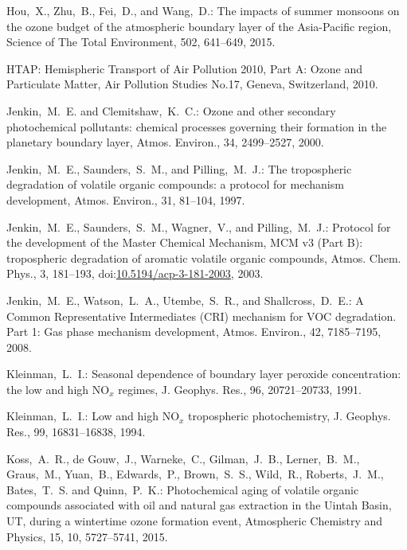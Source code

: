 \documentclass[acpd, online, hvmath]{copernicus}
\begin{document}
\begin{thebibliography}{34}
     Hou,~X., Zhu,~B., Fei,~D., and Wang,~D.: The impacts of summer monsoons on the ozone budget of the atmospheric boundary layer of the Asia-Pacific region, Science of The Total Environment, 502, 641--649, 2015.

  
 HTAP: Hemispheric Transport of Air
    Pollution 2010, Part A: Ozone and Particulate Matter, Air
    Pollution Studies No.17, Geneva, Switzerland, 2010.


 Jenkin,~M.~E. and
  Clemitshaw,~K.~C.: {Ozone and other secondary photochemical
    pollutants: chemical processes governing their formation in the
    planetary boundary layer}, Atmos. Environ., 34, 2499--2527,
  2000.


 Jenkin,~M.~E., Saunders,~S.~M., and
  Pilling,~M.~J.: {The tropospheric degradation of volatile organic
    compounds: a protocol for mechanism development}, Atmos. Environ.,
  31, 81--104, 1997.


 Jenkin,~M.~E., Saunders,~S.~M., Wagner,~V.,
  and Pilling,~M.~J.: Protocol for the development of the Master
  Chemical Mechanism, MCM v3 (Part B): tropospheric degradation of
  aromatic volatile organic compounds, Atmos. Chem. Phys., 3,
  181--193,
doi:\href{http://dx.doi.org/10.5194/acp-3-181-2003}{10.5194/acp-3-181-2003},
  2003.



 Jenkin,~M.~E., Watson,~L.~A.,
  Utembe,~S.~R., and Shallcross,~D.~E.: {A Common Representative
    Intermediates (CRI) mechanism for VOC degradation. Part 1: Gas
    phase mechanism development}, Atmos. Environ., 42, 7185--7195,
  2008.


 Kleinman,~L.~I.: {Seasonal
    dependence of boundary layer peroxide concentration: the low and
    high NO$_{x}$ regimes}, J. Geophys. Res., 96, 20721--20733,
  1991.


 Kleinman,~L.~I.: {Low and
    high NO$_{x}$ tropospheric photochemistry}, J. Geophys. Res.,
  99, 16831--16838, 1994.

 Koss,~A.~R., de Gouw,~J., Warneke,~C., Gilman,~J.~B., Lerner,~B.~M., Graus,~M., Yuan,~B., Edwards,~P., Brown,~S.~S., Wild,~R., Roberts,~J.~M., Bates,~T.~S. and Quinn,~P.~K.: {Photochemical aging of volatile organic compounds associated with oil and natural gas extraction in the Uintah Basin, UT, during a wintertime ozone formation event}, Atmospheric Chemistry and Physics, 15, 10, 5727--5741, 2015.


\end{thebibliography}
\end{document}

